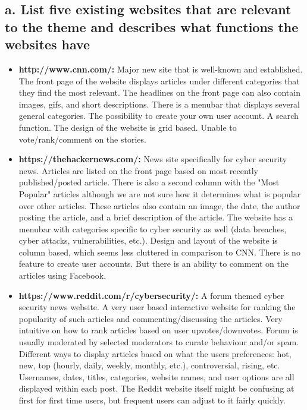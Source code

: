\documentclass{article}
\begin{document}
\subsection{a. List five existing websites that are relevant to the theme and describes what functions the websites have}
\begin{itemize}
    \item %
    \textbf{http://www.cnn.com/:}
    Major new site that is well-known and established.  The front page of the website displays articles under different categories that they find the most relevant.  The headlines on the front page can also contain images, gifs, and short descriptions.  There is a menubar that displays several general categories.  The possibility to create your own user account.  A search function.  The design of the website is grid based.  Unable to vote/rank/comment on the stories.

    \item %
    \textbf{https://thehackernews.com/:}
    News site specifically for cyber security news.  Articles are listed on the front page based on most recently published/posted article.  There is also a second column with the "Most Popular" articles although we are not sure how it determines what is popular over other articles.  These articles also contain an image, the date, the author posting the article, and a brief description of the article.  The website has a menubar with categories specific to cyber security as well (data breaches, cyber attacks, vulnerabilities, etc.). Design and layout of the website is column based, which seems less cluttered in comparison to CNN.  There is no feature to create user accounts.  But there is an ability to comment on the articles using Facebook.
    
    \item %
    \textbf{https://www.reddit.com/r/cybersecurity/:}
    A forum themed cyber security news website.  A very user based interactive website for ranking the popularity of such articles and commenting/discussing the articles.  Very intuitive on how to rank articles based on user upvotes/downvotes.  Forum is usually moderated by selected moderators to curate behaviour and/or spam.  Different ways to display articles based on what the users preferences: hot, new, top (hourly, daily, weekly, monthly, etc.), controversial, rising, etc. Usernames, dates, titles, categories, website names, and user options are all displayed within each post.  The Reddit website itself might be confusing at first for first time users, but frequent users can adjust to it fairly quickly.
    

\end{itemize}
\end{document}
